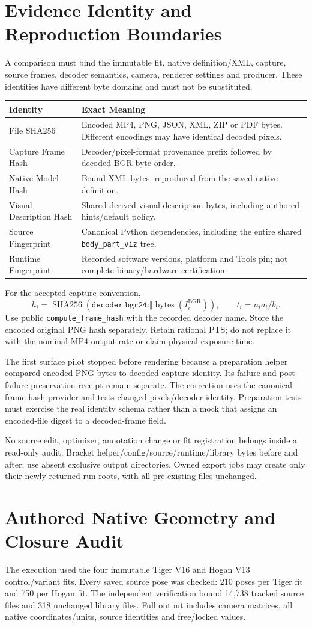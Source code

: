 \documentclass[11pt,letterpaper]{article}
\newcommand{\code}[1]{\nolinkurl{#1}}\newcommand{\hash}[1]{{\footnotesize\nolinkurl{#1}}}
\newcommand{\chapterpage}[1]{\clearpage\section{#1}}
\begin{document}
\section{Evidence Identity and Reproduction Boundaries}
A comparison must bind the immutable fit, native definition/XML, capture,
source frames, decoder semantics, camera, renderer settings and producer.
These identities have different byte domains and must not be substituted.
\par\smallskip
\begin{tabular}{@{}p{.27\linewidth}p{.67\linewidth}@{}}\toprule
Identity & Exact Meaning\\\midrule
File SHA256 & Encoded MP4, PNG, JSON, XML, ZIP or PDF bytes. Different encodings may have identical decoded pixels.\\
Capture Frame Hash & Decoder/pixel-format provenance prefix followed by decoded BGR byte order.\\
Native Model Hash & Bound XML bytes, reproduced from the saved native definition.\\
Visual Description Hash & Shared derived visual-description bytes, including authored hints/default policy.\\
Source Fingerprint & Canonical Python dependencies, including the entire shared \code{body_part_viz} tree.\\
Runtime Fingerprint & Recorded software versions, platform and Tools pin; not complete binary/hardware certification.\\\bottomrule
\end{tabular}
For the accepted capture convention,
\[
h_i=\operatorname{SHA256}(\texttt{decoder:bgr24:}\Vert\operatorname{bytes}(I_i^{\mathrm{BGR}})),
\qquad t_i=n_i a_i/b_i.
\]
Use public \code{compute_frame_hash} with the recorded decoder name. Store the
encoded original PNG hash separately. Retain rational PTS; do not replace it
with the nominal MP4 output rate or claim physical exposure time.

The first surface pilot stopped before rendering because a preparation helper
compared encoded PNG bytes to decoded capture identity. Its failure and
post-failure preservation receipt remain separate. The correction uses the
canonical frame-hash provider and tests changed pixels/decoder identity.
Preparation tests must exercise the real identity schema rather than a mock
that assigns an encoded-file digest to a decoded-frame field.

No source edit, optimizer, annotation change or fit registration belongs inside
a read-only audit. Bracket helper/config/source/runtime/library bytes before
and after; use absent exclusive output directories. Owned export jobs may
create only their newly returned run roots, with all pre-existing files unchanged.
\chapterpage{Authored Native Geometry and Closure Audit}
The execution used the four immutable Tiger V16 and Hogan V13 control/variant
fits. Every saved source pose was checked: 210 poses per Tiger fit and 750 per
Hogan fit. The independent verification bound 14,738 tracked source files and
318 unchanged library files. Full output includes camera matrices, all native
coordinates/units, source identities and free/locked values.
\end{document}
